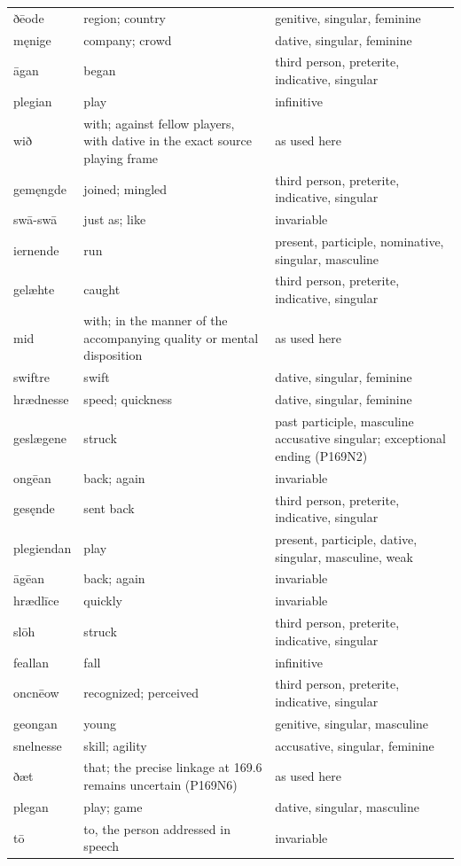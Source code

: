\begin{longtable}{@{}>{\raggedright\arraybackslash}p{26mm}>{\raggedright\arraybackslash}p{44.5mm}>{\raggedright\arraybackslash}p{47.88mm}@{}}
ðēode & region; country & genitive, singular, feminine \\
męnige & company; crowd & dative, singular, feminine \\
āgan & began & third person, preterite, indicative, singular \\
plegian & play & infinitive \\
wið & with; against fellow players, with dative in the exact source playing frame & as used here \\
gemęngde & joined; mingled & third person, preterite, indicative, singular \\
swā-swā & just as; like & invariable \\
iernende & run & present, participle, nominative, singular, masculine \\
gelæhte & caught & third person, preterite, indicative, singular \\
mid & with; in the manner of the accompanying quality or mental disposition & as used here \\
swiftre & swift & dative, singular, feminine \\
hrædnesse & speed; quickness & dative, singular, feminine \\
geslægene & struck & past participle, masculine accusative singular; exceptional ending (P169N2) \\
ongēan & back; again & invariable \\
gesęnde & sent back & third person, preterite, indicative, singular \\
plegiendan & play & present, participle, dative, singular, masculine, weak \\
āgēan & back; again & invariable \\
hrædlīce & quickly & invariable \\
slōh & struck & third person, preterite, indicative, singular \\
feallan & fall & infinitive \\
oncnēow & recognized; perceived & third person, preterite, indicative, singular \\
geongan & young & genitive, singular, masculine \\
snelnesse & skill; agility & accusative, singular, feminine \\
ðæt & that; the precise linkage at 169.6 remains uncertain (P169N6) & as used here \\
plegan & play; game & dative, singular, masculine \\
tō & to, the person addressed in speech & invariable \\

\end{longtable}
